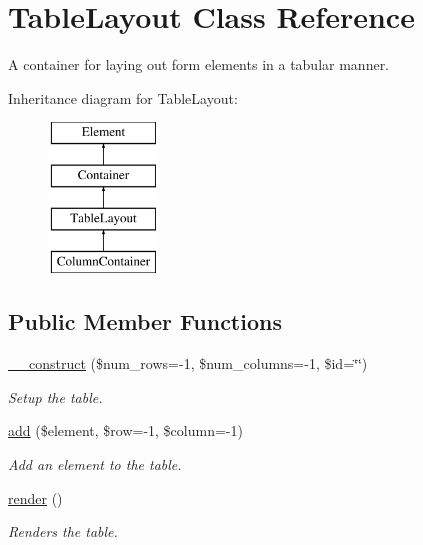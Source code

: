 \hypertarget{class_table_layout}{
\section{TableLayout Class Reference}
\label{class_table_layout}
}


A container for laying out form elements in a tabular manner.  


Inheritance diagram for TableLayout:\begin{figure}[H]
\begin{center}
\leavevmode
\includegraphics[height=4.000000cm]{class_table_layout}
\end{center}
\end{figure}
\subsection*{Public Member Functions}
\begin{DoxyCompactItemize}
\item 
\hyperlink{class_table_layout_a4dea17cd9e17e607d84b3ab42347ffaf}{\_\-\_\-construct} (\$num\_\-rows=-\/1, \$num\_\-columns=-\/1, \$id=\char`\"{}\char`\"{})
\begin{DoxyCompactList}\small\item\em Setup the table. \item\end{DoxyCompactList}\item 
\hyperlink{class_table_layout_a2a65f0d9e3cd5c256625ab2654ba83de}{add} (\$element, \$row=-\/1, \$column=-\/1)
\begin{DoxyCompactList}\small\item\em Add an element to the table. \item\end{DoxyCompactList}\item 
\hypertarget{class_table_layout_af6440066310157d69664575eb1f51ee4}{
\hyperlink{class_table_layout_af6440066310157d69664575eb1f51ee4}{render} ()}
\label{class_table_layout_af6440066310157d69664575eb1f51ee4}

\begin{DoxyCompactList}\small\item\em Renders the table. \item\end{DoxyCompactList}\end{DoxyCompactItemize}
